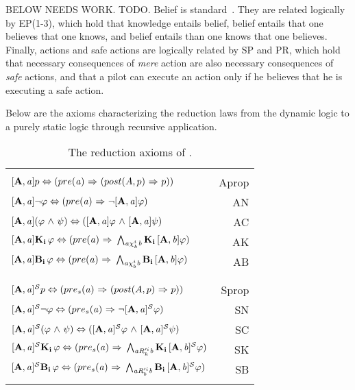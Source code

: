 BELOW NEEDS WORK.
TODO. Belief is standard~\cite{FHMV}. They are related logically by EP(1-3), which hold that knowledge entails belief, belief entails that one believes that one knows, and belief entails than one knows that one believes. Finally, actions and safe actions are logically related by SP and PR, which hold that necessary consequences of \emph{mere} action are also necessary consequences of \emph{safe} actions, and that a pilot can execute an action only if he believes that he is executing a safe action. 

Below are the axioms characterizing the reduction laws from the dynamic logic to a purely static logic through recursive application.\\
\begin{table}[H]
	\begin{center}
    \begin{tabular}{| l r |}
    \hline & \\
	$\mathbf{[A,\mathit{a}]}p \Leftrightarrow (pre(\mathit{a}){\ \Rightarrow \ }(post(A,p) {\ \Rightarrow \ } p))$ & Aprop \\
	$\mathbf{[A,\mathit{a}]}{\neg}\varphi \Leftrightarrow (pre(\mathit{a}) {\ \Rightarrow \ } {\neg} \mathbf{[A,\mathit{a}]}\varphi)$ & AN\\
	$\mathbf{[A,\mathit{a}]}(\varphi {\ \wedge \ } \psi) \Leftrightarrow (\mathbf{[A,\mathit{a}]}\varphi {\ \wedge \ } \mathbf{[A,\mathit{a}]}\psi)$ & AC\\
	$\mathbf{[A,\mathit{a}]}\mathbf{K}_{\mathbf{i}}\,\varphi \Leftrightarrow (pre(\mathit{a}) {\ \Rightarrow \ } \bigwedge_{\mathit{a}\chi_{k}^i \mathit{b}}\mathbf{K}_{\mathbf{i}}\,\mathbf{[A,\mathit{b}]}\varphi)$ & AK\\
	$\mathbf{[A,\mathit{a}]}\mathbf{B}_{\mathbf{i}}\,\varphi \Leftrightarrow (pre(\mathit{a}) {\ \Rightarrow \ } \bigwedge_{\mathit{a}\chi_{b}^i \mathit{b}}\mathbf{B}_{\mathbf{i}}\,\mathbf{[A,\mathit{b}]}\varphi)$ & AB\\ & \\
	\hline & \\
	$\mathbf{[A,\mathit{a}]^\mathcal{S}}p \Leftrightarrow (pre_s(\mathit{a}) {\ \Rightarrow \ } (post(A,p) {\ \Rightarrow \ } p))$ & Sprop\\
	$\mathbf{[A,\mathit{a}]^\mathcal{S}}{\neg}\varphi \Leftrightarrow (pre_s(\mathit{a}) {\ \Rightarrow \ } {\neg} \mathbf{[A,\mathit{a}]^\mathcal{S}}\varphi)$ & SN\\
	$\mathbf{[A,\mathit{a}]^\mathcal{S}}(\varphi {\ \wedge \ } \psi) \Leftrightarrow (\mathbf{[A,\mathit{a}]^\mathcal{S}}\varphi {\ \wedge \ } \mathbf{[A,\mathit{a}]^\mathcal{S}}\psi)$ & SC\\
	$\mathbf{[A,\mathit{a}]^\mathcal{S}}\mathbf{K}_{\mathbf{i}}\,\varphi \Leftrightarrow (pre_s(\mathit{a}) {\ \Rightarrow \ } \bigwedge_{\mathit{a}R_{k}'^{i}\mathit{b}}\mathbf{K}_{\mathbf{i}}\,\mathbf{[A,\mathit{b}]^\mathcal{S}}\varphi)$ & SK\\
	$\mathbf{[A,\mathit{a}]^\mathcal{S}}\mathbf{B}_{\mathbf{i}}\,\varphi \Leftrightarrow (pre_s(\mathit{a}) {\ \Rightarrow \ } \bigwedge_{\mathit{a}R_{b}'^{i}\mathit{b}}\mathbf{B}_{\mathbf{i}}\,\mathbf{[A,\mathit{b}]^\mathcal{S}}\varphi)$ & SB\\ & \\
	\hline
	\end{tabular}
	\caption{The reduction axioms of \DASL.}
	\end{center}
\end{table}

